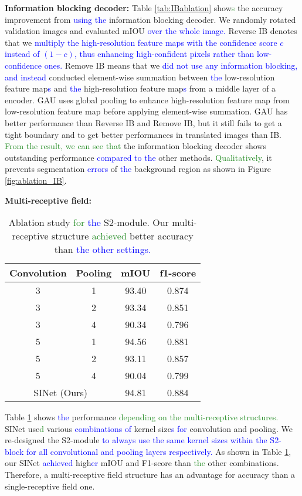 \documentclass[10pt,twocolumn,letterpaper]{article}
\newcommand\Lars[1]{\textcolor{blue}{#1}}
\newcommand\yj[1]{\textcolor{ForestGreen}{#1}}
\newcommand\Lars[1]{#1}
\newcommand\yj[1]{#1}
\begin{document}
\noindent
\textbf{Information blocking decoder: } 
Table \ref{tab:IBablation} show\yj{s} the accuracy improvement from \Lars{using the} information blocking decoder.
We randomly rotated validation images and evaluated mIOU \Lars{over the whole image. }
Reverse IB denotes that we \Lars{multiply the high-resolution feature maps with the confidence score $c$ instead of $(1 - c)$, thus enhancing high-confident pixels rather than low-confidence ones. }Remove IB means that we \Lars{did not use any information blocking, and instead} conducted element-wise summation between \Lars{the} low-resolution feature map\Lars{s} and \Lars{the} high-resolution feature map\Lars{s} from a middle layer of a encoder.
GAU uses global pooling to enhance high-resolution feature map from low-resolution feature map before applying element-wise summation.
GAU has better performance than Reverse IB and Remove IB, but it still fails to get a tight boundary and to get better performances in translated images than IB.
\yj{From the result, we can see that} the information blocking decoder shows outstanding performance \Lars{compared to the} other methods.
\yj{Qualitatively}, it prevents segmentation \Lars{errors} of \Lars{the} background region as shown in Figure \ref{fig:ablation_IB}.

\noindent
\textbf{Multi-receptive field: } 
\begin{table}[t]
  \begin{center}
    \begin{tabular}{ cc| cc}
    \hline
    Convolution & Pooling &  mIOU & f1-score \\
    \hline \hline
    
    3     & 1     & 93.40 & 0.874 \\
    3     & 2     & 93.34 & 0.851 \\
    3     & 4     & 90.34 & 0.796 \\
    5     & 1     & 94.56 & 0.881 \\
    5     & 2     & 93.11 & 0.857 \\
    5     & 4     & 90.04 & 0.799 \\
    \hline
    \multicolumn{2}{c|}{SINet (Ours)} & 94.81  & 0.884 \\

    \end{tabular}\end{center}
    
    \caption{Ablation study \yj{for} \Lars{the} S2-module. Our multi-receptive structure \yj{achieved} better accuracy than \Lars{the other settings. }}
     \label{tab:multiR}\end{table}Table \ref{tab:multiR} shows \Lars{the} performance \yj{depending on the multi-receptive structures.}
SINet use\yj{d} various \Lars{combinations of} kernel size\Lars{s for} convolution and pooling.
We re-designed the S2-module \Lars{to always use the same kernel sizes within the S2-block for all convolutional and pooling layers respectively. }As shown in Table \ref{tab:multiR}, our SINet \Lars{achieved} high\Lars{er} mIOU and F1-score than \yj{the} other combinations.
Therefore, a multi-receptive field structure has an advantage for accuracy than a single-receptive field one.
\end{document}
